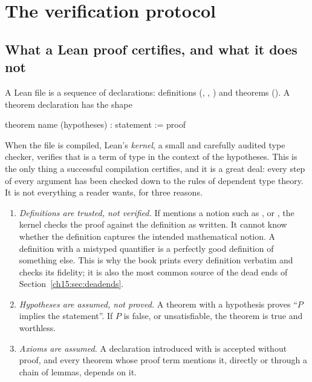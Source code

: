 \section{The verification protocol}\label{ch15:sec:protocol}

\subsection{What a Lean proof certifies, and what it does not}\label{ch15:sec:kernel}

A Lean file is a sequence of declarations: definitions (, ,
) and theorems (). A theorem declaration has the shape
\begin{plaincode}
theorem name (hypotheses) : statement := proof
\end{plaincode}
When the file is compiled, Lean's \emph{kernel}, a small and carefully audited type checker,
verifies that  is a term of type  in the context of the hypotheses.
This is the only thing a successful compilation certifies, and it is a great deal: every step of
every argument has been checked down to the rules of dependent type theory. It is not everything a
reader wants, for three reasons.

\begin{enumerate}[label=(\alph*)]
\item \emph{Definitions are trusted, not verified.} If  mentions a notion such as
  ,  or , the kernel checks the
  proof against the definition as written. It cannot know whether the definition captures the
  intended mathematical notion. A definition with a mistyped quantifier is a perfectly good
  definition of something else. This is why the book prints every definition verbatim and checks
  its fidelity; it is also the most common source of the dead ends of
  Section~\ref{ch15:sec:deadends}.
\item \emph{Hypotheses are assumed, not proved.} A theorem with a hypothesis
   proves ``$P$ implies the statement''. If $P$ is false, or unsatisfiable, the
  theorem is true and worthless.
\item \emph{Axioms are assumed.} A declaration introduced with  is accepted without
  proof, and every theorem whose proof term mentions it, directly or through a chain of lemmas,
  depends on it.
\end{enumerate}


